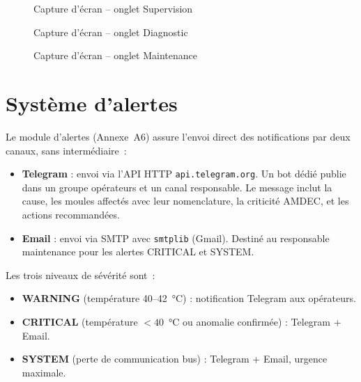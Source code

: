 \begin{figure}[htbp]
  \centering
  \caption{Capture d'écran -- onglet Supervision}
  \label{fig:ui_supervision}
\end{figure}

\begin{figure}[htbp]
  \centering
  \caption{Capture d'écran -- onglet Diagnostic}
\end{figure}

\begin{figure}[htbp]
  \centering
  \caption{Capture d'écran -- onglet Maintenance}
\end{figure}

\section{Système d'alertes}

Le module d'alertes (Annexe~A6) assure l'envoi direct des notifications par deux canaux, sans intermédiaire~:

\begin{itemize}
  \item \textbf{Telegram} : envoi via l'API HTTP \texttt{api.telegram.org}. Un bot dédié publie dans un groupe opérateurs et un canal responsable. Le message inclut la cause, les moules affectés avec leur nomenclature, la criticité AMDEC, et les actions recommandées.
  \item \textbf{Email} : envoi via SMTP avec \texttt{smtplib} (Gmail). Destiné au responsable maintenance pour les alertes CRITICAL et SYSTEM.
\end{itemize}

Les trois niveaux de sévérité sont~:

\begin{itemize}
  \item \textbf{WARNING} (température 40--42~\si{\celsius}) : notification Telegram aux opérateurs.
  \item \textbf{CRITICAL} (température \(<40\)~\si{\celsius} ou anomalie confirmée) : Telegram + Email.
  \item \textbf{SYSTEM} (perte de communication bus) : Telegram + Email, urgence maximale.
\end{itemize}

